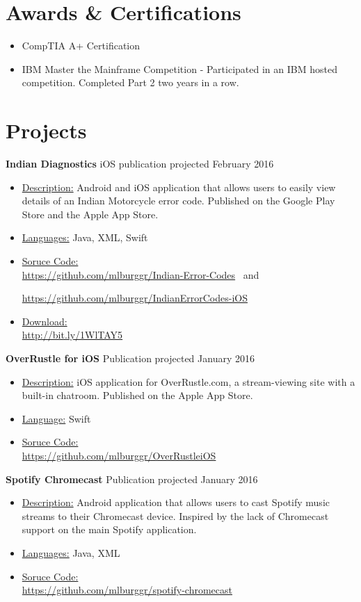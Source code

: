 \documentclass[margin]{res}
\begin{document}
\begin{resume}
 
\section{Awards \& Certifications}
\begin{itemize}
\item CompTIA A+ Certification
\item IBM Master the Mainframe Competition - Participated in an IBM hosted competition. Completed Part 2 two years in a row.
\end{itemize}

\section{Projects}
{\bf Indian Diagnostics} \hfill iOS publication projected February 2016
\begin{itemize}   
 \item \underline{Description:} Android and iOS application that allows users to easily view details of an Indian Motorcycle error code. Published on the Google Play Store and the Apple App Store.\
 \item \underline{Languages:} Java, XML, Swift\
 \item \underline{Soruce Code:} \\ \url{https://github.com/mlburggr/Indian-Error-Codes}      \ 
 and 

  \url{https://github.com/mlburggr/IndianErrorCodes-iOS}\
  
 \item \underline{Download:} \\ \url{http://bit.ly/1WlTAY5}
\end{itemize}

{\bf OverRustle for iOS} \hfill Publication projected January 2016
\begin{itemize}
 \item \underline{Description:} iOS application for OverRustle.com, a stream-viewing site with a built-in chatroom. Published on the Apple App Store.\
 \item \underline{Language:} Swift
 \item \underline{Soruce Code:} \\
 \url{https://github.com/mlburggr/OverRustleiOS}\
\end{itemize}

{\bf Spotify Chromecast} \hfill Publication projected January 2016
\begin{itemize}
 \item \underline{Description:} Android application that allows users to cast Spotify music streams to their Chromecast device. Inspired by the lack of Chromecast support on the main Spotify application.\
 \item \underline{Languages:} Java, XML
 \item \underline{Soruce Code:} \\
 \url{https://github.com/mlburggr/spotify-chromecast}\
\end{itemize}


\end{resume}
\end{document}
